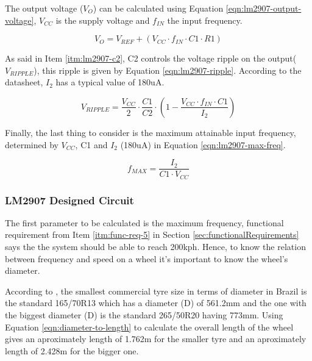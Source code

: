 			The output voltage ($V_{O}$) can be calculated using Equation \ref{eqn:lm2907-output-voltage}, $V_{CC}$ is the supply voltage and $f_{IN}$ the input frequency.

			\begin{equation}\label{eqn:lm2907-output-voltage}
				V_{O}=V_{REF} + \left( V_{CC} \cdot f_{IN} \cdot C1 \cdot R1 \right)
			\end{equation}

			As said in Item \ref{itm:lm2907-c2}, C2 controls the voltage ripple on the output($V_{RIPPLE}$), this ripple is given by Equation \ref{eqn:lm2907-ripple}. According to the datasheet, $I_{2}$ has a typical value of 180uA.

			\begin{equation}\label{eqn:lm2907-ripple}
				V_{RIPPLE}=\frac{V_{CC}}{2} \cdot \frac{C1}{C2} \cdot \left( 1 - \frac{V_{CC} \cdot f_{IN} \cdot C1}{I_{2}} \right)
			\end{equation}

			Finally, the last thing to consider is the maximum attainable input frequency, determined by $V_{CC}$, C1 and $I_{2}$ (180uA) in Equation \ref{eqn:lm2907-max-freq}.

			\begin{equation}\label{eqn:lm2907-max-freq}
				f_{MAX} = \frac{I_{2}}{C1 \cdot V_{CC}}
			\end{equation}

		\subsubsection{LM2907 Designed Circuit}\label{sssec:lm2907-designed-circuit}

			The first parameter to be calculated is the maximum frequency, functional requirement from Item \ref{itm:func-req-5} in Section \ref{sec:functionalRequirements} says the the system should be able to reach 200kph. Hence, to know the relation between frequency and speed on a wheel it's important to know the wheel's diameter.
			\par
			According to \cite{pneus-facil-todas-as-medidas-de-pneu}, the smallest commercial tyre size in terms of diameter in Brazil is the standard 165/70R13 which has a diameter (D) of 561.2mm and the one with the biggest diameter (D) is the standard 265/50R20 having 773mm. Using Equation \ref{eqn:diameter-to-length} to calculate the overall length of the wheel gives an aproximately length of 1.762m for the smaller tyre and an aproximately length of 2.428m for the bigger one.

